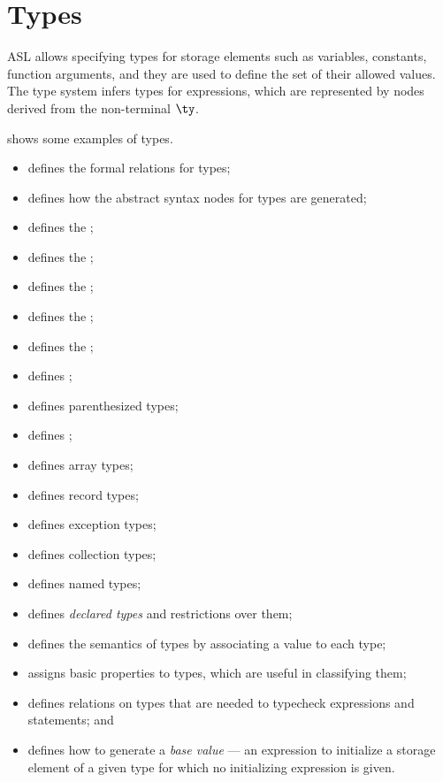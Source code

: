 \chapter{Types\label{chap:Types}}

ASL allows specifying types for storage elements such as variables, constants, function arguments,
and they are used to define the set of their allowed values.
%
The type system infers types for expressions, which are represented by \typedast{} nodes derived
from the non-terminal $\ty$.

 shows some examples of types.

\ChapterOutline
\begin{itemize}
  \item {} defines the formal relations for types;
  \item {} defines how the abstract syntax nodes for types
    are generated;
  \item {} defines the \integertypeterm{};
  \item {} defines the \realtypeterm{};
  \item {} defines the \stringtypeterm{};
  \item {} defines the \booleantypeterm{};
  \item {} defines the \bitvectortypeterm{};
  \item {} defines \Tupletypesterm{};
  \item {} defines parenthesized types;
  \item {} defines \Enumerationtypesterm{};
  \item {} defines array types;
  \item {} defines record types;
  \item {} defines exception types;
  \item {} defines collection types;
  \item {} defines named types;
  \item {} defines \emph{declared types} and restrictions over them;
  \item {} defines the semantics of types by associating a value to each type;
  \item {} assigns basic properties to types, which are useful
        in classifying them;
  \item {} defines relations on types that are needed to typecheck
        expressions and statements; and
  \item {} defines how to generate a \emph{base value} --- an expression
        to initialize a storage element of a given type for which no initializing
        expression is given.
\end{itemize}

